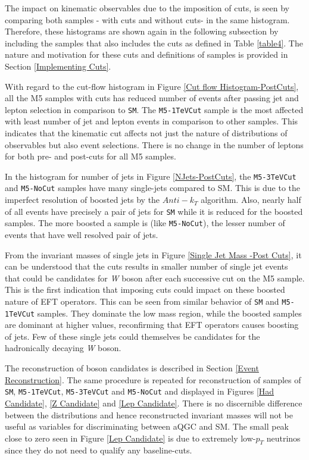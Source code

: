 The impact on kinematic observables due to the imposition of cuts, is seen by comparing both samples - with cuts and without cuts- in the same histogram. Therefore, these histograms are shown again in the following subsection by including the samples that also includes the cuts as defined in Table \ref{table4}. The nature and motivation for these cuts and definitions of samples is provided in Section \ref{Implementing Cuts}.

With regard to the cut-flow histogram in Figure \ref{Cut flow Histogram-PostCuts}, all the M5 samples with cuts has reduced number of events after passing jet and lepton selection in comparison to \texttt{SM}. The \texttt{M5-1TeVCut} sample is the most affected with least number of jet and lepton events in comparison to other samples. This indicates that the kinematic cut affects not just the nature of distributions of observables but also event selections. There is no change in the number of leptons for both pre- and post-cuts for all M5 samples.

In the histogram for number of jets in Figure \ref{NJets-PostCuts}, the \texttt{M5-3TeVCut} and \texttt{M5-NoCut} samples have many single-jets compared to SM. This is due to the imperfect resolution of boosted jets by the $Anti-k_{T}$ algorithm. Also, nearly half of all events have precisely a pair of jets for \texttt{SM} while it is reduced for the boosted samples. The more boosted a sample is (like \texttt{M5-NoCut}), the  lesser number of events that have well resolved pair of jets.

From the invariant masses of single jets in Figure \ref{Single Jet Mass -Post Cuts},  it can be understood that the cuts results in smaller number of single jet events that could be candidates for \textit{W }boson after each successive cut on the M5 sample. This is the first indication that imposing cuts could impact on these boosted nature of EFT operators. This can be seen from similar behavior of \texttt{SM} and \texttt{M5-1TeVCut} samples. They dominate the low mass region, while the boosted samples are dominant at higher values, reconfirming that EFT operators causes boosting of jets. Few of these single jets could themselves be candidates for the hadronically decaying \textit{W} boson.

The reconstruction of boson candidates is described in Section \ref{Event Reconstruction}. The same procedure is repeated for reconstruction of samples of \texttt{SM}, \texttt{M5-1TeVCut},  \texttt{M5-3TeVCut} and \texttt{M5-NoCut} and displayed in Figures \ref{Had Candidate}, \ref{Z Candidate} and \ref{Lep Candidate}. There is no discernible difference between the distributions and hence reconstructed invariant masses will not be useful as variables for discriminating between aQGC and SM. The small peak close to zero seen in Figure \ref{Lep Candidate} is due to extremely low-$p_{T}$ neutrinos  since they do not need to qualify any baseline-cuts. 


